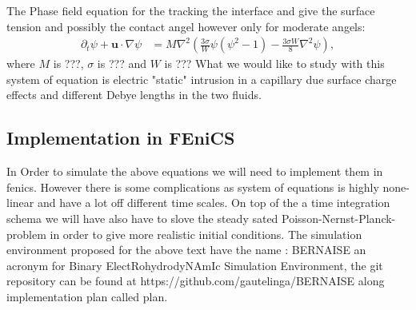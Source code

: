 \documentclass[a4paper,10pt]{article}
\numberwithin{equation}{section}
\numberwithin{figure}{section}
\begin{document}
The Phase field equation for the tracking the interface and give the surface tension and possibly the contact angel however only for moderate angels: 
\begin{align}
\partial_t \psi + \mathbf{u}\cdot\nabla\psi &= M\nabla^2\left(\frac{3 \sigma }{W} \psi \left(\psi^2 -1\right) - \frac{3 \sigma W}{8}\nabla^2 \psi\right),
\end{align}
where $M$ is ???, $\sigma$ is ??? and $W$ is ???\newline 
What we would like to study with this system of equation is electric "static" intrusion in a capillary due surface charge effects and different Debye lengths in the two fluids.       
\subsection{Implementation in FEniCS}
In Order to simulate the above equations we will need to implement them in fenics. However there is some complications as system of equations is highly none-linear and have a lot off different time scales. On top of the a time integration schema we will have also have to slove the steady sated Poisson-Nernst-Planck-problem in order to give more realistic initial conditions. 
The simulation environment proposed for the above text have the name : BERNAISE an acronym for Binary ElectRohydrodyNAmIc Simulation Environment, the git repository can be found at https://github.com/gautelinga/BERNAISE along implementation plan called plan. 
 
   
\end{document}
